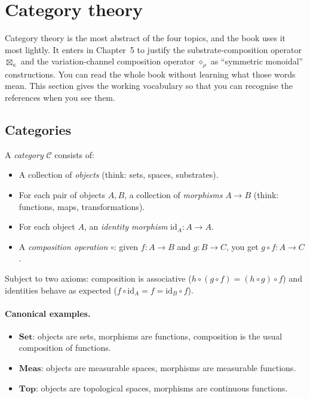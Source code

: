 \section{Category theory}

Category theory is the most abstract of the four topics, and the
book uses it most lightly. It enters in Chapter~5 to justify the
substrate-composition operator $\boxtimes_\kappa$ and the
variation-channel composition operator $\diamond_\rho$ as
``symmetric monoidal'' constructions. You can read the whole book
without learning what those words mean. This section gives the
working vocabulary so that you can recognise the references when
you see them.

\subsection*{Categories}

A \emph{category} $\mathcal{C}$ consists of:

\begin{itemize}[leftmargin=1.5em,itemsep=2pt]
  \item A collection of \emph{objects} (think: sets, spaces,
    substrates).
  \item For each pair of objects $A, B$, a collection of
    \emph{morphisms} $A \to B$ (think: functions, maps,
    transformations).
  \item For each object $A$, an \emph{identity morphism} $\mathrm{id
    }_A : A \to A$.
  \item A \emph{composition operation} $\circ$: given $f : A \to B$
    and $g : B \to C$, you get $g \circ f : A \to C$.
\end{itemize}

Subject to two axioms: composition is associative ($h \circ (g
\circ f) = (h \circ g) \circ f$) and identities behave as expected
($f \circ \mathrm{id}_A = f = \mathrm{id}_B \circ f$).

\paragraph{Canonical examples.}

\begin{itemize}[leftmargin=1.5em,itemsep=2pt]
  \item $\mathbf{Set}$: objects are sets, morphisms are functions,
    composition is the usual composition of functions.
  \item $\mathbf{Meas}$: objects are measurable spaces, morphisms
    are measurable functions.
  \item $\mathbf{Top}$: objects are topological spaces, morphisms
    are continuous functions.
\end{itemize}

